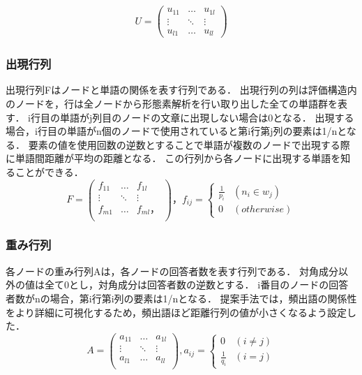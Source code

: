 \documentclass[syuuron]{kuee}
\begin{document}
				\begin{eqnarray}
				 U = \left(
				    \begin{array}{cccc}
				    	u_{11} & \ldots & u_{1l} \\
				    	\vdots & \ddots & \vdots \\
				    	u_{l1} & \ldots & u_{ll}
					\end{array}
				 \right)
				\end{eqnarray}	
		
			\subsubsection{出現行列}
				出現行列Fはノードと単語の関係を表す行列である．
				出現行列の列は評価構造内のノードを，行は全ノードから形態素解析を行い取り出した全ての単語群を表す．
				i行目の単語がj列目のノードの文章に出現しない場合は0となる．
				出現する場合，i行目の単語がn個のノードで使用されていると第i行第j列の要素は1/nとなる．
				要素の値を使用回数の逆数とすることで単語が複数のノードで出現する際に単語間距離が平均の距離となる．
				この行列から各ノードに出現する単語を知ることができる．
				\begin{equation}
				 	F = \left(
				    \begin{array}{cccc}
				    	f_{11} & \ldots & f_{1l} \\
				    	\vdots & \ddots & \vdots \\
				    	f_{m1} & \ldots & f_{ml}，\\ 
					\end{array}
					\right)，
				 	f_{ij} = \left\{ \begin{array}{ll}
						\frac{1}{p_i} & (n_i \in w_j) \\
				    	0 & (otherwise)
				  	\end{array} 
				  	\right.
				\end{equation}
				
			\subsubsection{重み行列}
				各ノードの重み行列Aは，各ノードの回答者数を表す行列である．
				対角成分以外の値は全て0とし，対角成分は回答者数の逆数とする．
				i番目のノードの回答者数がnの場合，第i行第i列の要素は1/nとなる．
				提案手法では，頻出語の関係性をより詳細に可視化するため，頻出語ほど距離行列の値が小さくなるよう設定した．
				\begin{equation}
				 A = \left(
				    \begin{array}{cccc}
				    	a_{11} & \ldots & a_{1l} \\
				    	\vdots & \ddots & \vdots \\
				    	a_{l1} & \ldots & a_{ll} \\
					\end{array}
				 \right),
				 a_{ij} = \left\{ \begin{array}{ll}
				     0 & (i ≠ j) \\
				     \frac{1}{q_i} & (i = j)
				  \end{array} \right.
				\end{equation}
				
\end{document}
